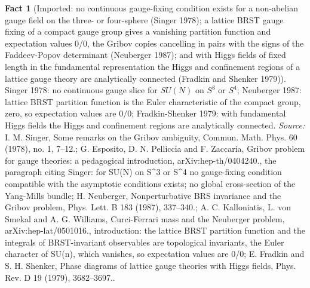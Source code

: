 \documentclass[11pt]{article}
\theoremstyle{definition}
\newtheorem{fact}[theorem]{Fact}
\theoremstyle{plain}
\begin{document}
\begin{fact}[Imported: no continuous gauge-fixing condition exists for a non-abelian gauge field on the three- or four-sphere (Singer 1978); a lattice BRST gauge fixing of a compact gauge group gives a vanishing partition function and expectation values 0/0, the Gribov copies cancelling in pairs with the signs of the Faddeev-Popov determinant (Neuberger 1987); and with Higgs fields of fixed length in the fundamental representation the Higgs and confinement regions of a lattice gauge theory are analytically connected (Fradkin and Shenker 1979)]\label{c:synthesis.imported-singer-gauge-slice-neuberger-lattice-brst-and-fradkin-shenker-complementarity}
Singer 1978: no continuous gauge slice for $SU(N)$ on $S^{3}$ or $S^{4}$; Neuberger 1987: lattice BRST partition function is the Euler characteristic of the compact group, zero, so expectation values are $0/0$; Fradkin-Shenker 1979: with fundamental Higgs fields the Higgs and confinement regions are analytically connected.
\emph{Source:} I. M. Singer, Some remarks on the Gribov ambiguity, Commun. Math. Phys. 60 (1978), no. 1, 7--12.; G. Esposito, D. N. Pelliccia and F. Zaccaria, Gribov problem for gauge theories: a pedagogical introduction, arXiv:hep-th/0404240., the paragraph citing Singer: for SU(N) on S\^{}3 or S\^{}4 no gauge-fixing condition compatible with the asymptotic conditions exists; no global cross-section of the Yang-Mills bundle; H. Neuberger, Nonperturbative BRS invariance and the Gribov problem, Phys. Lett. B 183 (1987), 337--340.; A. C. Kalloniatis, L. von Smekal and A. G. Williams, Curci-Ferrari mass and the Neuberger problem, arXiv:hep-lat/0501016., introduction: the lattice BRST partition function and the integrals of BRST-invariant observables are topological invariants, the Euler character of SU(n), which vanishes, so expectation values are 0/0; E. Fradkin and S. H. Shenker, Phase diagrams of lattice gauge theories with Higgs fields, Phys. Rev. D 19 (1979), 3682--3697..
\end{fact}
\end{document}
